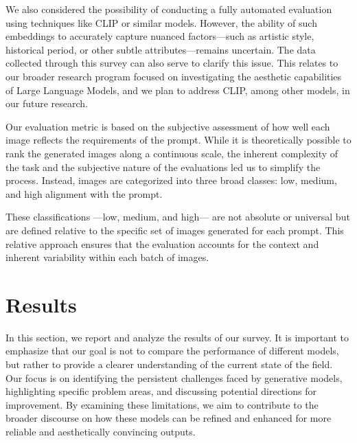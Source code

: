 \documentclass[sn-mathphys]{sn-jnl}
\begin{document}
We also considered the possibility of conducting a fully automated evaluation using techniques like CLIP \cite{CLIP} or similar models. However, the ability of such embeddings to accurately capture nuanced factors—such as artistic style, historical period, or other subtle attributes—remains uncertain. The data collected through this survey can also serve to clarify this issue.
This relates to our broader research program focused on investigating the aesthetic capabilities of Large Language Models, and we plan to address CLIP, among other models, in our future research.

Our evaluation metric is based on the subjective assessment of how well each image reflects the requirements of the prompt. While it is theoretically possible to rank the generated images along a continuous scale, the inherent complexity of the task and the subjective nature of the evaluations led us to simplify the process. Instead, images are categorized into three broad classes: low, medium, and high alignment with the prompt.

These classifications —low, medium, and high— are not absolute or universal but are defined relative to the specific set of images generated for each prompt. This relative approach ensures that the evaluation accounts for the context and inherent variability within each batch of images.




\section{Results}
\label{sec:results} 
In this section, we report and analyze the results of our survey. It is important to emphasize that our goal is not to compare the performance of different models, but
rather to provide a clearer understanding of the current state of the field. Our focus is on identifying the persistent challenges faced by generative models, highlighting specific problem areas, and discussing potential directions for improvement. By examining these limitations, we aim to contribute to the broader discourse on how these models can be refined and enhanced for more reliable and aesthetically convincing outputs.
\end{document}
